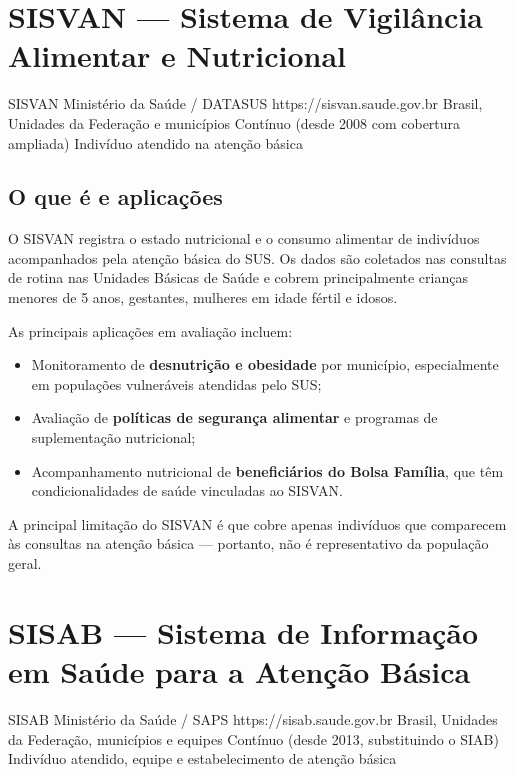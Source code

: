 \section{SISVAN --- Sistema de Vigilância Alimentar e Nutricional}

\ficharapida
  {SISVAN}
  {Ministério da Saúde / DATASUS}
  {https://sisvan.saude.gov.br}
  {Brasil, Unidades da Federação e municípios}
  {Contínuo (desde 2008 com cobertura ampliada)}
  {Indivíduo atendido na atenção básica}

\subsection{O que é e aplicações}

O SISVAN registra o estado nutricional e o consumo alimentar de indivíduos acompanhados pela atenção básica do SUS. Os dados são coletados nas consultas de rotina nas Unidades Básicas de Saúde e cobrem principalmente crianças menores de 5 anos, gestantes, mulheres em idade fértil e idosos.

As principais aplicações em avaliação incluem:
\begin{itemize}
  \item Monitoramento de \textbf{desnutrição e obesidade} por município, especialmente em populações vulneráveis atendidas pelo SUS;
  \item Avaliação de \textbf{políticas de segurança alimentar} e programas de suplementação nutricional;
  \item Acompanhamento nutricional de \textbf{beneficiários do Bolsa Família}, que têm condicionalidades de saúde vinculadas ao SISVAN.
\end{itemize}

A principal limitação do SISVAN é que cobre apenas indivíduos que comparecem às consultas na atenção básica --- portanto, não é representativo da população geral.

\section{SISAB --- Sistema de Informação em Saúde para a Atenção Básica}

\ficharapida
  {SISAB}
  {Ministério da Saúde / SAPS}
  {https://sisab.saude.gov.br}
  {Brasil, Unidades da Federação, municípios e equipes}
  {Contínuo (desde 2013, substituindo o SIAB)}
  {Indivíduo atendido, equipe e estabelecimento de atenção básica}

